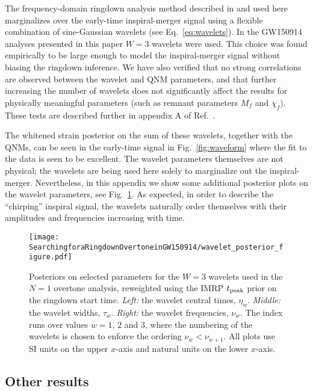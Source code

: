 The frequency-domain ringdown analysis method described in \cite{Finch:2021qph} and used here marginalizes over the early-time inspiral-merger signal using a flexible combination of sine-Gaussian wavelets (see Eq.~\ref{eq:wavelets}).
In the GW150914 analyses presented in this paper $W=3$ wavelets were used.
This choice was found empirically to be large enough to model the inspiral-merger signal without biasing the ringdown inference.
We have also verified that no strong correlations are observed between the wavelet and QNM parameters, and that further increasing the number of wavelets does not significantly affect the results for physically meaningful parameters (such as remnant parameters $M_f$ and $\chi_f$). 
These tests are described further in appendix A of Ref.~\cite{Finch:2021qph}.

The whitened strain posterior on the sum of these wavelets, together with the QNMs, can be seen in the early-time signal in Fig.~\ref{fig:waveform} where the fit to the data is seen to be excellent.
The wavelet parameters themselves are not physical; the wavelets are being used here solely to marginalize out the inspiral-merger. 
Nevertheless, in this appendix we show some additional posterior plots on the wavelet parameters, see Fig.~\ref{fig:wavelet}.
As expected, in order to describe the ``chirping'' inspiral signal, the wavelets naturally order themselves with their amplitudes and frequencies increasing with time. 

\begin{figure}[t]
    \centering
    \texttt{[image: SearchingforaRingdownOvertoneinGW150914/wavelet\_posterior\_figure.pdf]}
    \caption[Posteriors on selected wavelet parameters used in the GW150914 overtone analysis]{ 
    Posteriors on selected parameters for the $W=3$ wavelets used in the $N=1$ overtone analysis, reweighted using the IMRP $t_{\rm peak}$ prior on the ringdown start time.
    \emph{Left:} the wavelet central times, $\eta_w$.
    \emph{Middle:} the wavelet widths, $\tau_w$.
    \emph{Right:} the wavelet frequencies, $\nu_w$. 
    The index runs over values $w=1,\,2$ and $3$, where the numbering of the wavelets is chosen to enforce the ordering $\nu_{w}<\nu_{w+1}$.
    All plots use SI units on the upper $x$-axis and natural units on the lower $x$-axis. 
    }
    \label{fig:wavelet}
\end{figure}



\subsection{Other results}\label{subsec:other_results}

